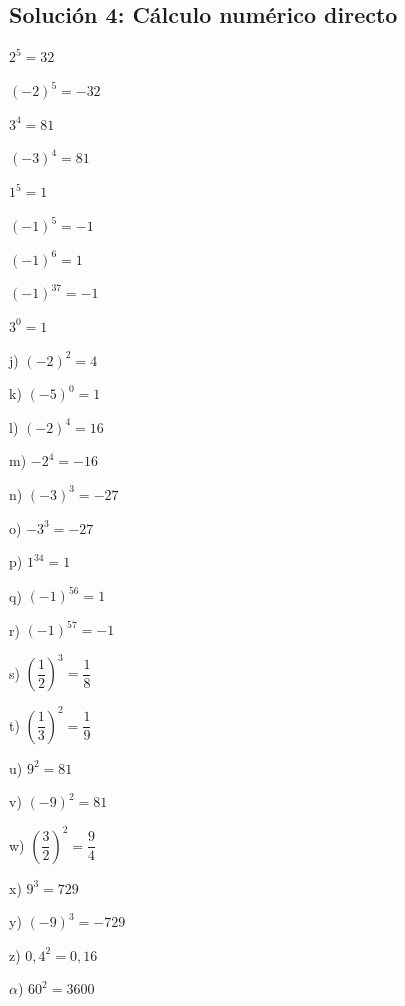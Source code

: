 \documentclass[a4paper,12pt]{article}
\begin{document}
\subsection*{Solución 4: Cálculo numérico directo}

\begin{enumerate}[label=\alph*)]
    \begin{minipage}[t]{0.3\textwidth}
        \item $2^{5} = 32$
        \item $(-2)^{5} = -32$
        \item $3^{4} = 81$
        \item $(-3)^{4} = 81$
        \item $1^{5} = 1$
        \item $(-1)^{5} = -1$
        \item $(-1)^{6} = 1$
        \item $(-1)^{37} = -1$
        \item $3^{0} = 1$
    \end{minipage}
    \begin{minipage}[t]{0.3\textwidth}
        \item[j)] $(-2)^{2} = 4$
        \item[k)] $(-5)^{0} = 1$
        \item[l)] $(-2)^{4} = 16$
        \item[m)] $-2^{4} = -16$
        \item[n)] $(-3)^{3} = -27$
        \item[o)] $-3^{3} = -27$
        \item[p)] $1^{34} = 1$
        \item[q)] $(-1)^{56} = 1$
        \item[r)] $(-1)^{57} = -1$
    \end{minipage}
    \begin{minipage}[t]{0.3\textwidth}
        \item[s)] $\left(\dfrac{1}{2}\right)^{3} = \dfrac{1}{8}$
        \item[t)] $\left(\dfrac{1}{3}\right)^{2} = \dfrac{1}{9}$
        \item[u)] $9^{2} = 81$
        \item[v)] $(-9)^{2} = 81$
        \item[w)] $\left(\dfrac{3}{2}\right)^{2} = \dfrac{9}{4}$
        \item[x)] $9^{3} = 729$
        \item[y)] $(-9)^{3} = -729$
        \item[z)] $0{,}4^{2} = 0{,}16$
        \item[$\alpha$)] $60^{2} = 3600$
    \end{minipage}
\end{enumerate}
\end{document}
